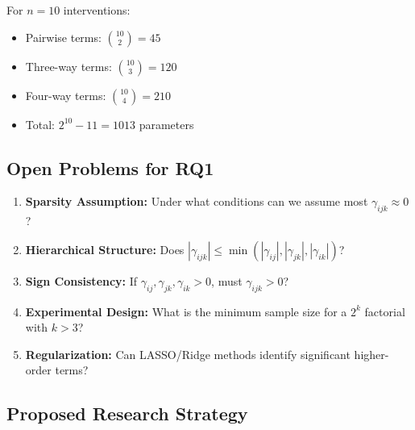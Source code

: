 \begin{example}
For $n = 10$ interventions:
\begin{itemize}[noitemsep]
    \item Pairwise terms: $\binom{10}{2} = 45$
    \item Three-way terms: $\binom{10}{3} = 120$
    \item Four-way terms: $\binom{10}{4} = 210$
    \item Total: $2^{10} - 11 = 1013$ parameters
\end{itemize}
\end{example}

\subsection{Open Problems for RQ1}

\begin{enumerate}
    \item \textbf{Sparsity Assumption:} Under what conditions can we assume most $\gamma_{ijk} \approx 0$?

    \item \textbf{Hierarchical Structure:} Does $|\gamma_{ijk}| \leq \min(|\gamma_{ij}|, |\gamma_{jk}|, |\gamma_{ik}|)$?

    \item \textbf{Sign Consistency:} If $\gamma_{ij}, \gamma_{jk}, \gamma_{ik} > 0$, must $\gamma_{ijk} > 0$?

    \item \textbf{Experimental Design:} What is the minimum sample size for a $2^k$ factorial with $k > 3$?

    \item \textbf{Regularization:} Can LASSO/Ridge methods identify significant higher-order terms?
\end{enumerate}

\subsection{Proposed Research Strategy}

